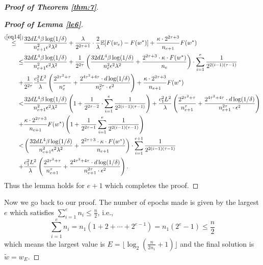 \documentclass[12pt]{alt2022} %
\renewcommand{\tilde}{\widetilde}
\begin{document}
\begin{proof}[{\bf Proof of Theorem \ref{thm:7}}]
\begin{proof}[{\bf Proof of Lemma \ref{le6}}]
\begin{equation*}
\begin{aligned}
	\overset{ (\ref{eq14})}{\leq}	& \frac{32dL^4\beta\log(1/\delta)}{n_{e+1}^2\epsilon^2\lambda^2}+\frac{\lambda}{2^{2\tau+1}}\cdot\frac{2}{\lambda} \mathbb{E}[F(w_e)-F(w^{*})]+\frac{\kappa \cdot 2^{2\tau+3}}{n_{e+1}} F(w^{*})\\
	{\leq}	& \frac{32dL^4\beta\log(1/\delta)}{n_{e+1}^2\epsilon^2\lambda^2}+\frac{1}{2^{2\tau}} \left(\frac{32dL^4\beta\log(1/\delta)}{n_e^2\epsilon^2\lambda^2}+\frac{2^{2\tau+3}\cdot \kappa \cdot F(w^{*})}{n_e}\right) \cdot \sum\limits_{i=1}^{e}\frac{1}{2^{2(i-1)(\tau -1)}}\\
	+&\frac{1}{2^{2\tau}}\frac{c_1^2 L^2}{\lambda}\left(\frac{2^{2\tau^2+\tau}}{n_e^{\tau}}+\frac{2^{4\tau^2+4\tau  }\cdot d\log(1/\delta)}{n_e^{2\tau}\cdot \epsilon^2}\right)+\frac{\kappa \cdot 2^{2\tau+3}}{n_{e+1}} F(w^{*})\\
	<	&  \frac{32dL^4\beta\log(1/\delta)}{n_{e+1}^2\epsilon^2\lambda^2}\left(1+\frac{1}{2^{2\tau-2}}\cdot \sum\limits_{i=1}^{e}\frac{1}{2^{2(i-1)(\tau -1)}}\right)+\frac{c_1^2 L^2}{\lambda}\left(\frac{2^{2\tau^2+\tau}}{n_{e+1}^{\tau}}+\frac{2^{4\tau^2+4\tau  }\cdot d\log(1/\delta)}{n_{e+1}^{2\tau}\cdot \epsilon^2}\right)\\
	+&\frac{\kappa \cdot 2^{2\tau+3}}{n_{e+1}} F(w^{*})\left(1+\frac{1}{2^{2\tau-1}}\sum\limits_{i=1}^{e}\frac{1}{2^{2(i-1)(\tau -1)}}\right)\\
	< &\left(\frac{32dL^4\beta\log(1/\delta)}{n_{e+1}^2\epsilon^2\lambda^2}+\frac{2^{2\tau+3}\cdot \kappa \cdot F(w^{*})}{n_{e+1}}\right) \cdot \sum\limits_{i=1}^{{e+1}}\frac{1}{2^{2(i-1)(\tau -1)}}\\
	+&\frac{c_1^2 L^2}{\lambda}\left(\frac{2^{2\tau^2+\tau}}{n_{e+1}^{\tau}}+\frac{2^{4\tau^2+4\tau  }\cdot d\log(1/\delta)}{n_{e+1}^{2\tau}\cdot \epsilon^2}\right).
	\end{aligned}
	\end{equation*}
	Thus the lemma holds for $e+1$ which completes the proof. 
\end{proof}
Now we go back to our proof. The number of epochs made is given by the largest $e$ which satisfies $\sum\limits_{i=1}^{e} n_i\leq \frac{n}{2}$, i.e.,
\begin{equation*}
\sum\limits_{i=1}^{e} n_i=n_1(1+2+\cdots+2^{e-1})=n_1(2^e-1)\leq \frac{n}{2}
\end{equation*}
which means the largest value is
$E=\lfloor\log_2(\frac{n}{2n_1}+1)\rfloor$
and the final solution is $\tilde{w}=w_E$.


\end{proof}
\end{document}
